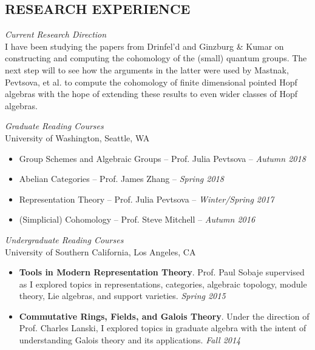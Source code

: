 \documentclass[margin, 10pt]{res} %
\begin{document}
\begin{resume}
\section{RESEARCH EXPERIENCE}

{\sl Current Research Direction}\\
I have been studying the papers from Drinfel'd and Ginzburg \& Kumar on constructing and computing
the cohomology of the (small) quantum groups. The next step will to see how the arguments in the latter
were used by Mastnak, Pevtsova, et al. to compute the cohomology of finite dimensional pointed Hopf algebras
with the hope of extending these results to even wider classes of Hopf algebras.

{\sl Graduate Reading Courses} \\
University of Washington, Seattle, WA
\begin{itemize} \itemsep -1pt %
	\item Group Schemes and Algebraic Groups -- Prof. Julia Pevtsova -- {\sl Autumn 2018}
	\item Abelian Categories -- Prof. James Zhang -- {\sl Spring 2018}
	\item Representation Theory -- Prof. Julia Pevtsova -- {\sl Winter/Spring 2017}
	\item (Simplicial) Cohomology -- Prof. Steve Mitchell -- {\sl Autumn 2016}
\end{itemize}

{\sl Undergraduate Reading Courses}\\
University of Southern California, Los Angeles, CA
\begin{itemize} \itemsep -1pt %
	\item {\bfseries Tools in Modern Representation Theory}. Prof. Paul Sobaje supervised as I explored topics in representations, categories, algebraic topology, module theory, Lie algebras, and support varieties. {\sl Spring 2015}
	\item {\bfseries Commutative Rings, Fields, and Galois Theory}. Under the direction of Prof. Charles Lanski, I explored topics in graduate algebra with the intent of understanding Galois theory and its applications. {\sl Fall 2014}
\end{itemize}


 

\end{resume}
\end{document}
